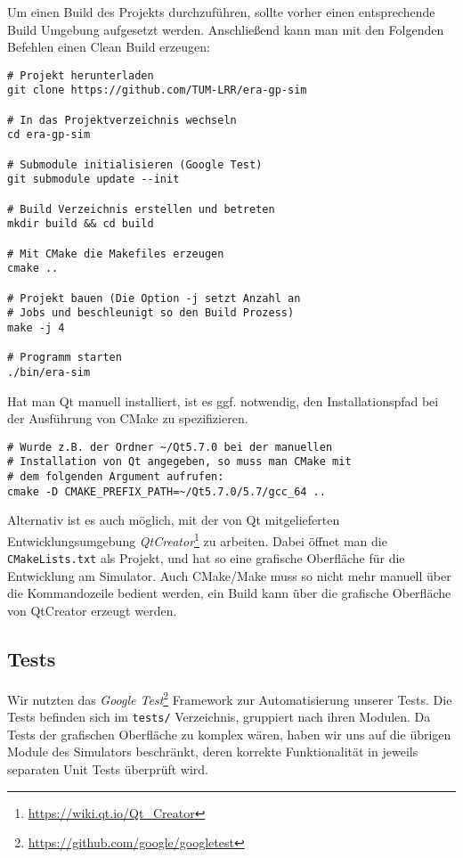 Um einen Build des Projekts durchzuführen, sollte vorher einen entsprechende Build Umgebung
aufgesetzt werden. Anschließend kann man mit den Folgenden Befehlen einen Clean Build erzeugen:

\begin{lstlisting}
# Projekt herunterladen
git clone https://github.com/TUM-LRR/era-gp-sim

# In das Projektverzeichnis wechseln
cd era-gp-sim

# Submodule initialisieren (Google Test)
git submodule update --init

# Build Verzeichnis erstellen und betreten
mkdir build && cd build

# Mit CMake die Makefiles erzeugen
cmake ..

# Projekt bauen (Die Option -j setzt Anzahl an
# Jobs und beschleunigt so den Build Prozess)
make -j 4

# Programm starten
./bin/era-sim
\end{lstlisting}

Hat man Qt manuell installiert, ist es ggf. notwendig, den Installationspfad bei der
Ausführung von CMake zu spezifizieren.

\begin{lstlisting}
# Wurde z.B. der Ordner ~/Qt5.7.0 bei der manuellen
# Installation von Qt angegeben, so muss man CMake mit
# dem folgenden Argument aufrufen:
cmake -D CMAKE_PREFIX_PATH=~/Qt5.7.0/5.7/gcc_64 ..
\end{lstlisting}

Alternativ ist es auch möglich, mit der von Qt mitgelieferten Entwicklungsumgebung
\textit{QtCreator}\footnote{\url{https://wiki.qt.io/Qt_Creator}} zu arbeiten.
Dabei öffnet man die \texttt{CMakeLists.txt} als Projekt, und hat so eine grafische
Oberfläche für die Entwicklung am Simulator. Auch CMake/Make muss so nicht mehr
manuell über die Kommandozeile bedient werden, ein Build kann über die grafische
Oberfläche von QtCreator erzeugt werden.

\subsection{Tests}

Wir nutzten das \textit{Google Test}\footnote{\url{https://github.com/google/googletest}} Framework
zur Automatisierung unserer Tests. Die Tests befinden sich im \texttt{tests/} Verzeichnis, gruppiert
nach ihren Modulen. Da Tests der grafischen Oberfläche zu komplex wären, haben wir uns auf die übrigen
Module des Simulators beschränkt, deren korrekte Funktionalität in jeweils separaten Unit Tests
überprüft wird.

